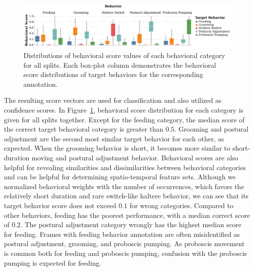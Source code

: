\begin{figure}[htb!]
	\centering
	\includegraphics[width=\linewidth]{figures/BehavioralScoresDistributions_perBehavior.pdf}
	\caption[Distributions of behavioral score values of each behavioral category for all splits.]{Distributions of behavioral score values of each behavioral category for all splits.
		Each box-plot column demonstrates the behavioral score distributions of target behaviors for the corresponding annotation.\label{figure:behavioral-score-distributions}}
\end{figure}

The resulting score vectors are used for classification and also utilized as confidence scores.
In Figure~\ref{figure:behavioral-score-distributions}, behavioral score distribution for each category is given for all splits together.
Except for the feeding category, the median score of the correct target behavioral category is greater than $0.5$.
Grooming and postural adjustment are the second most similar target behavior for each other, as expected.
When the grooming behavior is short, it becomes more similar to short-duration moving and postural adjustment behavior.
Behavioral scores are also helpful for revealing similarities and dissimilarities between behavioral categories and can be helpful for determining spatio-temporal feature sets.
Although we normalized behavioral weights with the number of occurrences, which favors the relatively short duration and rare switch-like haltere behavior, we can see that its target behavior score does not exceed $0.1$ for wrong categories.
Compared to other behaviors, feeding has the poorest performance, with a median correct score of $0.2$.
The postural adjustment category wrongly has the highest median score for feeding.
Frames with feeding behavior annotation are often misidentified as postural adjustment, grooming, and proboscis pumping.
As proboscis movement is common both for feeding and proboscis pumping, confusion with the proboscis pumping is expected for feeding.

